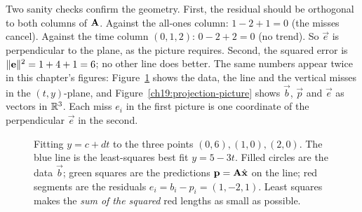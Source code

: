 Two sanity checks confirm the geometry. First, the residual should be orthogonal to both columns
of $\mathbf{A}$. Against the all-ones column: $1-2+1=0$ (the misses cancel). Against the time column
$(0,1,2)$: $0-2+2=0$ (no trend). So $\vec{e}$ is perpendicular to the plane, as the picture
requires. Second, the squared error is $\lVert\mathbf{e}\rVert^2 = 1+4+1=6$; no other line does better.
The same numbers appear twice in this chapter's figures: Figure~\ref{ch19:line-fit} shows the data,
the line and the vertical misses in the $(t,y)$-plane, and Figure~\ref{ch19:projection-picture}
shows $\vec{b}$, $\vec{p}$ and $\vec{e}$ as vectors in $\mathbb{R}^3$. Each miss $e_i$ in the first picture
is one coordinate of the perpendicular $\vec{e}$ in the second.

\begin{figure}[H]
\centering
{}
\caption{Fitting $y=c+dt$ to the three points $(0,6),(1,0),(2,0)$. The blue line is the
least-squares best fit $y=5-3t$. Filled circles are the data $\vec{b}$; green squares are the
predictions $\mathbf{p}=\mathbf{A}\hat{\mathbf{x}}$ on the line; red segments are the residuals
$e_i=b_i-p_i=(1,-2,1)$. Least squares makes the \emph{sum of the squared} red lengths as small as
possible.}
\label{ch19:line-fit}
\end{figure}

